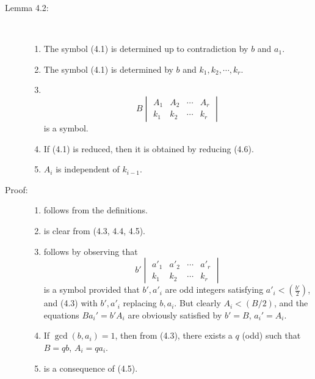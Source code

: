 \begin{description}

  \item[Lemma 4.2:] $\ $
    \begin{enumerate}[\hspace{1cm}(i)]
      \item The symbol (4.1) is determined up to contradiction by $b$ and $a_{1}$.
      \item The symbol (4.1) is determined by $b$ and $k_{1}, k_{2}, \cdots, k_{r}$.
      \item $\ $
        \begin{equation}
        B \begin{vmatrix}
        A_{1} & A_{2} & \cdots & A_{r} \\
        k_{1} & k_{2} & \cdots & k_{r} 
        \end{vmatrix}  \tag{4.6}
        \end{equation}
        is a symbol.
      \item If (4.1) is reduced, then it is obtained by reducing (4.6).
      \item $A_{i}$ is independent of $k_{i-1}$.
    \end{enumerate}

  \item[Proof:]
    \begin{enumerate}[\hspace{1cm}(i)]
      \item follows from the definitions. 
      \item is clear from (4.3, 4.4, 4.5). 
      \item follows by observing that
        \begin{equation*}
        b' \begin{vmatrix}
        a'_{1} & a'_{2} & \cdots & a'_{r} \\
        k_{1} & k_{2} & \cdots & k_{r}
        \end{vmatrix}
        \end{equation*}
        is a symbol provided that $b',a'_{i}$ are odd integers satisfying $a'_{i} < \left( \frac{b'}{2} \right)$, and (4.3) with $b',a'_{i}$ replacing $b,a_{i}$. But clearly $A_{i} < (B/2)$, and the equations $Ba_{i}' = b' A_{i}$ are obviously satisfied by $b' = B$, $a_{i}' = A_{i}$. 
      \item If $\gcd(b,a_{i}) = 1$, then from (4.3), there exists a $q$ (odd) such that $B = qb$, $A_{i} = qa_{i}$. 
      \item is a consequence of (4.5).
    \end{enumerate}

\end{description}

